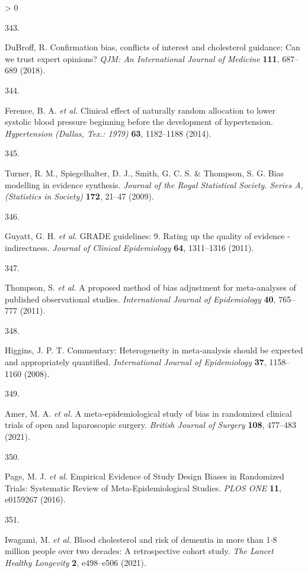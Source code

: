\documentclass[a4paper, twoside]{templates/ociamthesis}
\newlength{\cslhangindent}
\newlength{\csllabelwidth}
\newenvironment{CSLReferences}[3] %
 {%
  \setlength{\parindent}{0pt}
  \ifodd #1 \everypar{\setlength{\hangindent}{\cslhangindent}}\ignorespaces\fi
  \ifnum #2 > 0
  \setlength{\parskip}{#2\baselineskip}
  \fi
 }%
 {}
\newcommand{\CSLLeftMargin}[1]{\parbox[t]{\maxof{\widthof{#1}}{\csllabelwidth}}{#1}}
\newcommand{\CSLRightInline}[1]{\parbox[t]{\linewidth - \csllabelwidth}{#1}}
\begin{document}
\begin{CSLReferences}{0}{0}
\leavevmode\hypertarget{ref-dubroff2018}{}%
\CSLLeftMargin{343. }
\CSLRightInline{DuBroff, R. Confirmation bias, conflicts of interest and cholesterol guidance: Can we trust expert opinions? \emph{QJM: An International Journal of Medicine} \textbf{111}, 687--689 (2018).}

\leavevmode\hypertarget{ref-ference2014}{}%
\CSLLeftMargin{344. }
\CSLRightInline{Ference, B. A. \emph{et al.} Clinical effect of naturally random allocation to lower systolic blood pressure beginning before the development of hypertension. \emph{Hypertension (Dallas, Tex.: 1979)} \textbf{63}, 1182--1188 (2014).}

\leavevmode\hypertarget{ref-turner2009}{}%
\CSLLeftMargin{345. }
\CSLRightInline{Turner, R. M., Spiegelhalter, D. J., Smith, G. C. S. \& Thompson, S. G. Bias modelling in evidence synthesis. \emph{Journal of the Royal Statistical Society. Series A, (Statistics in Society)} \textbf{172}, 21--47 (2009).}

\leavevmode\hypertarget{ref-guyatt2011}{}%
\CSLLeftMargin{346. }
\CSLRightInline{Guyatt, G. H. \emph{et al.} {GRADE} guidelines: 9. {Rating} up the quality of evidence - indirectness. \emph{Journal of Clinical Epidemiology} \textbf{64}, 1311--1316 (2011).}

\leavevmode\hypertarget{ref-thompson2011}{}%
\CSLLeftMargin{347. }
\CSLRightInline{Thompson, S. \emph{et al.} A proposed method of bias adjustment for meta-analyses of published observational studies. \emph{International Journal of Epidemiology} \textbf{40}, 765--777 (2011).}

\leavevmode\hypertarget{ref-higgins2008}{}%
\CSLLeftMargin{348. }
\CSLRightInline{Higgins, J. P. T. Commentary: Heterogeneity in meta-analysis should be expected and appropriately quantified. \emph{International Journal of Epidemiology} \textbf{37}, 1158--1160 (2008).}

\leavevmode\hypertarget{ref-amer2021}{}%
\CSLLeftMargin{349. }
\CSLRightInline{Amer, M. A. \emph{et al.} A meta-epidemiological study of bias in randomized clinical trials of open and laparoscopic surgery. \emph{British Journal of Surgery} \textbf{108}, 477--483 (2021).}

\leavevmode\hypertarget{ref-page2016}{}%
\CSLLeftMargin{350. }
\CSLRightInline{Page, M. J. \emph{et al.} Empirical {Evidence} of {Study Design Biases} in {Randomized Trials}: Systematic {Review} of {Meta}-{Epidemiological Studies}. \emph{PLOS ONE} \textbf{11}, e0159267 (2016).}

\leavevmode\hypertarget{ref-iwagami2021}{}%
\CSLLeftMargin{351. }
\CSLRightInline{Iwagami, M. \emph{et al.} Blood cholesterol and risk of dementia in more than 1{\(\cdot\)}8 million people over two decades: A retrospective cohort study. \emph{The Lancet Healthy Longevity} \textbf{2}, e498--e506 (2021).}


\end{CSLReferences}
\end{document}
